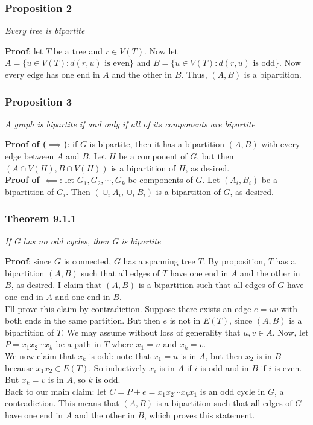 \documentclass{report}
\begin{document}
\subsubsection{Proposition 2}
\begin{center}
\textit{Every tree is bipartite}
\end{center}
\textbf{Proof}: let $T$ be a tree and $r \in V(T)$. Now let $A = \{u \in V(T) : d(r,u) \,\,\mathrm{is \,\, even}\}$ and $B = \{u \in V(T) : d(r,u) \,\,\mathrm{is \,\, odd}\}$. Now every edge has one end in $A$ and the other in $B$. Thus, $(A, B)$ is a bipartition.
\subsubsection{Proposition 3}
\begin{center}
\textit{A graph is bipartite if and only if all of its components are bipartite}
\end{center}
\textbf{Proof of ($\implies$)}: if $G$ is bipartite, then it has a bipartition $(A, B)$ with every edge between $A$ and $B$. Let $H$ be a component of $G$, but then $(A\cap V(H), B \cap V(H))$ is a bipartition of $H$, as desired. \\
\textbf{Proof of $\impliedby$}: let $G_1, G_2, \cdots, G_k$ be components of $G$. Let $(A_i, B_i)$ be a bipartition of $G_i$. Then $(\cup_i A_i, \cup_{i} B_i)$ is a bipartition of $G$, as desired.
\subsubsection{Theorem 9.1.1}
\begin{center}
\textit{If G has no odd cycles, then G is bipartite}
\end{center}
\textbf{Proof}: since $G$ is connected, $G$ has a spanning tree $T$. By proposition, $T$ has a bipartition $(A, B)$ such that all edges of $T$ have one end in $A$ and the other in $B$, as desired. I claim that $(A, B)$ is a bipartition such that all edges of $G$ have one end in $A$ and one end in $B$.\\
I'll prove this claim by contradiction. Suppose there exists an edge $e = uv$ with both ends in the same partition. But then $e$ is not in $E(T)$, since $(A,B)$ is a bipartition of $T$. We may assume without loss of generality that $u,v \in A$. Now, let $P = x_1x_2 \cdots x_k$ be a path in $T$ where $x_1 = u$ and $x_k = v$. \\We now claim that $x_k$ is odd: note that $x_1 = u$ is in $A$, but then $x_2$ is in $B$ because $x_1x_2 \in E(T)$. So inductively $x_i$ is in $A$ if $i$ is odd and in $B$ if $i$ is even. But $x_k = v$ is in $A$, so $k$ is odd.\\
Back to our main claim: let $C = P + e = x_1x_2 \cdots x_kx_1$ is an odd cycle in $G$, a contradiction. This means that $(A,B)$ is a bipartition such that all edges of $G$ have one end in $A$ and the other in $B$, which proves this statement.

\end{document}
